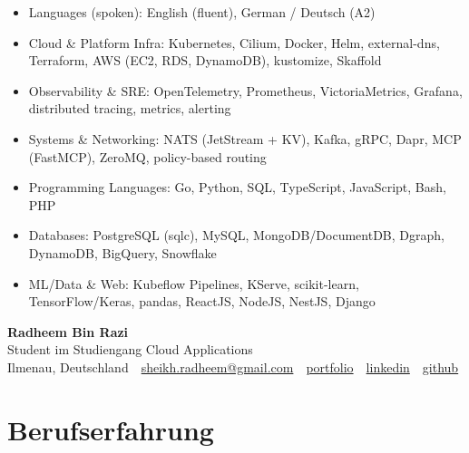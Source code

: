\documentclass[10pt,a4paper]{resume}
\makeatletter
\newcommand{\Portfolio}{https://radheem.github.io/my-cv}
\newcommand{\PortfolioText}{portfolio}
\newcommand{\GitHub}{https://github.com/radheem}
\newcommand{\LinkedIn}{https://www.linkedin.com/in/radheem-razi}
\newcommand{\Email}{sheikh.radheem@gmail.com}
\makeatother
\begin{document}
\begin{itemize}[leftmargin=1.4em,nosep,topsep=2pt]
  \item Languages (spoken): English (fluent), German / Deutsch (A2)
  \item Cloud \& Platform Infra: Kubernetes, Cilium, Docker, Helm, external-dns, Terraform, AWS (EC2, RDS, DynamoDB), kustomize, Skaffold
  \item Observability \& SRE: OpenTelemetry, Prometheus, VictoriaMetrics, Grafana, distributed tracing, metrics, alerting
  \item Systems \& Networking: NATS (JetStream + KV), Kafka, gRPC, Dapr, MCP (FastMCP), ZeroMQ, policy-based routing
  \item Programming Languages: Go, Python, SQL, TypeScript, JavaScript, Bash, PHP
  \item Databases: PostgreSQL (sqlc), MySQL, MongoDB/DocumentDB, Dgraph, DynamoDB, BigQuery, Snowflake
  \item ML/Data \& Web: Kubeflow Pipelines, KServe, scikit-learn, TensorFlow/Keras, pandas, ReactJS, NodeJS, NestJS, Django
\end{itemize}

\clearpage
{}

\begin{center}
  {\huge\bfseries Radheem Bin Razi}\\[3pt]
  {\large Student im Studiengang Cloud Applications}\\[6pt]
  \small
  Ilmenau, Deutschland \,\textbar\,
  \href{mailto:\Email}{\Email} \,\textbar\,
  \href{\Portfolio}{\PortfolioText} \,\textbar\,
  \href{\LinkedIn}{linkedin} \,\textbar\,
  \href{\GitHub}{github}
\end{center}
\vspace{2pt}

\section{Berufserfahrung}
\end{document}
